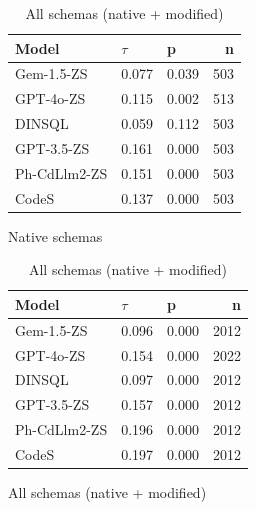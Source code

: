 \begin{table}
  \centering
  \caption{Kendall-Tau ($\tau$) Correlations between \emph{Query Combined Naturalness} and \emph{Execution Accuracy}.}
  \begin{subfigure}{.5\linewidth}
      \centering
      \caption{Native schemas}
      \begin{tabular}{lllr}
\toprule
Model & $\tau$ & p & n \\
\midrule
Gem-1.5-ZS & 0.077 & 0.039 & 503 \\
GPT-4o-ZS & 0.115 & 0.002 & 513 \\
DINSQL & 0.059 & 0.112 & 503 \\
GPT-3.5-ZS & 0.161 & 0.000 & 503 \\
Ph-CdLlm2-ZS & 0.151 & 0.000 & 503 \\
CodeS & 0.137 & 0.000 & 503 \\
\bottomrule
\end{tabular}

      \label{table:executionktaunative}
  \end{subfigure}%
  \begin{subfigure}{.5\linewidth}
      \centering
      \caption{All schemas (native + modified)}
      \begin{tabular}{lllr}
\toprule
Model & $\tau$ & p & n \\
\midrule
Gem-1.5-ZS & 0.096 & 0.000 & 2012 \\
GPT-4o-ZS & 0.154 & 0.000 & 2022 \\
DINSQL & 0.097 & 0.000 & 2012 \\
GPT-3.5-ZS & 0.157 & 0.000 & 2012 \\
Ph-CdLlm2-ZS & 0.196 & 0.000 & 2012 \\
CodeS & 0.197 & 0.000 & 2012 \\
\bottomrule
\end{tabular}

      \label{table:executionktauall}
  \end{subfigure}
\end{table}




